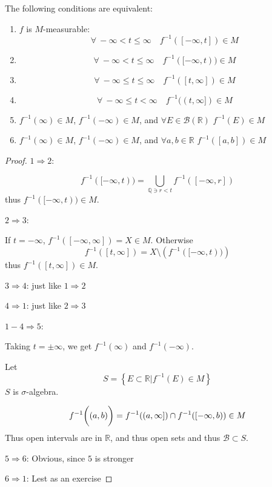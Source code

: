 \begin{prop}
	The following conditions are equivalent:
	\begin{enumerate}
		\item $f$ is $M$-measurable: $$\forall  \: -\infty < t \leq \infty \quad f^{-1}([-\infty, t]) \in M$$
		\item $$\forall  \: -\infty < t \leq \infty \quad f^{-1}([-\infty, t)) \in M$$
		\item $$\forall  \: -\infty \leq t \leq \infty \quad f^{-1}([t, \infty]) \in M$$
		\item $$\forall  \: -\infty \leq t < \infty \quad f^{-1}((t, \infty]) \in M$$
		\item $f^{-1}(\infty) \in M$, $f^{-1}(-\infty) \in M$, and $\forall E\in \mathcal{B}(\mathbb{R})$ $f^{-1}(E) \in M$
		\item $f^{-1}(\infty) \in M$, $f^{-1}(-\infty) \in M$, and $\forall a,b \in \mathbb{R}$ $f^{-1}([a,b]) \in M$
	\end{enumerate}

\begin{proof}
	$1\Rightarrow 2$:
	
	$$f^{-1}([-\infty, t)) = \bigcup_{\mathbb{Q} \ni r <t} f^{-1} ([-\infty, r])$$
	thus $f^{-1}([-\infty, t)) \in M$.
	
	$2\Rightarrow 3$:
	
	If $t=-\infty$, $f^{-1}([-\infty, \infty]) = X \in M$. Otherwise
	$$f^{-1}([t, \infty]) = X \setminus \left(f^{-1}([-\infty, t))\right) $$
	thus $f^{-1}([t, \infty]) \in M$.
	
	$3\Rightarrow 4$: just like $1\Rightarrow 2$
	
	
	$4\Rightarrow 1$: just like $2\Rightarrow 3$
	
	$1-4 \Rightarrow 5$:
	
	Taking $t=\pm \infty$, we get $f^{-1}(\infty)$ and $f^{-1}(-\infty)$. 
	
	Let 
	$$S = \left\{ E\subset \mathbb{R} | f^{-1}(E)\in M \right\}$$
	$S$ is $\sigma$-algebra.
	
	$$f^{-1} \qty\bigg((a,b)) = f^{-1}((a,\infty]) \cap f^{-1} ([-\infty, b)) \in M$$
	Thus open intervals are in $\mathbb{R}$, and thus open sets and thus $\mathcal{B}\subset S$.
	
	
	$5 \Rightarrow 6$: Obvious, since $5$ is stronger
	
	
	$6 \Rightarrow 1$: Lest as an exercise
\end{proof}
\end{prop}